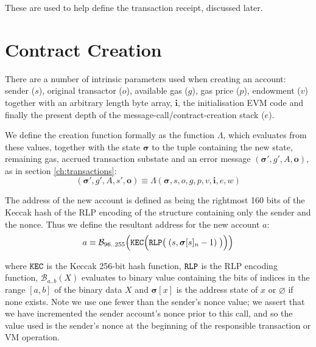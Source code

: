 \documentclass[9pt,oneside]{amsart}
\begin{document}
\begin{multicols}{2}
These are used to help define the transaction receipt, discussed later.

\section{Contract Creation} \label{ch:create}

There are a number of intrinsic parameters used when creating an account: sender ($s$), original transactor ($o$), available gas ($g$), gas price ($p$), endowment ($v$) together with an arbitrary length byte array, $\mathbf{i}$, the initialisation EVM code and finally the present depth of the message-call/contract-creation stack ($e$).

We define the creation function formally as the function $\Lambda$, which evaluates from these values, together with the state $\boldsymbol{\sigma}$ to the tuple containing the new state, remaining gas, accrued transaction substate and an error message $(\boldsymbol{\sigma}', g', A, \mathbf{o})$, as in section \ref{ch:transactions}:
\begin{equation}
(\boldsymbol{\sigma}', g', A, s', \mathbf{o}) \equiv \Lambda(\boldsymbol{\sigma}, s, o, g, p, v, \mathbf{i}, e, w)
\end{equation}

The address of the new account is defined as being the rightmost 160 bits of the Keccak hash of the RLP encoding of the structure containing only the sender and the nonce. Thus we define the resultant address for the new account $a$:
\begin{equation}
a \equiv \mathcal{B}_{96..255}\Big(\mathtt{\tiny KEC}\Big(\mathtt{\tiny RLP}\big(\;(s, \boldsymbol{\sigma}[s]_n - 1)\;\big)\Big)\Big)
\end{equation}

where $\mathtt{\tiny KEC}$ is the Keccak 256-bit hash function, $\mathtt{\tiny RLP}$ is the RLP encoding function, $\mathcal{B}_{a..b}(X)$ evaluates to binary value containing the bits of indices in the range $[a, b]$ of the binary data $X$ and $\boldsymbol{\sigma}[x]$ is the address state of $x$ or $\varnothing$ if none exists. Note we use one fewer than the sender's nonce value; we assert that we have incremented the sender account's nonce prior to this call, and so the value used is the sender's nonce at the beginning of the responsible transaction or VM operation.


\end{multicols}
\end{document}
